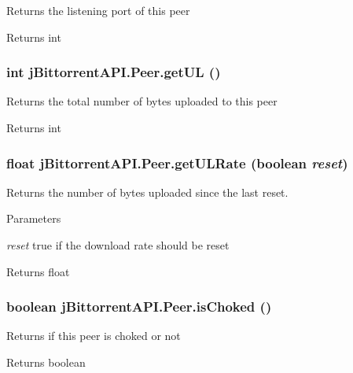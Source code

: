 \label{classj_bittorrent_a_p_i_1_1_peer_a8d9e796f58c6c0083ff7336986af72f6}
Returns the listening port of this peer \begin{DoxyReturn}{Returns}
int 
\end{DoxyReturn}
\hypertarget{classj_bittorrent_a_p_i_1_1_peer_a7e728ed4c9f505509669eec249ff4728}{
\subsubsection[{getUL}]{\setlength{\rightskip}{0pt plus 5cm}int jBittorrentAPI.Peer.getUL ()}}
\label{classj_bittorrent_a_p_i_1_1_peer_a7e728ed4c9f505509669eec249ff4728}
Returns the total number of bytes uploaded to this peer \begin{DoxyReturn}{Returns}
int 
\end{DoxyReturn}
\hypertarget{classj_bittorrent_a_p_i_1_1_peer_a3a73a98b5bed923f31a60ea06bec9d58}{
\subsubsection[{getULRate}]{\setlength{\rightskip}{0pt plus 5cm}float jBittorrentAPI.Peer.getULRate (boolean {\em reset})}}
\label{classj_bittorrent_a_p_i_1_1_peer_a3a73a98b5bed923f31a60ea06bec9d58}
Returns the number of bytes uploaded since the last reset. 
\begin{DoxyParams}{Parameters}
\item[{\em reset}]true if the download rate should be reset \end{DoxyParams}
\begin{DoxyReturn}{Returns}
float 
\end{DoxyReturn}
\hypertarget{classj_bittorrent_a_p_i_1_1_peer_aed29d428f718b3547a91a1fc5008d1df}{
\subsubsection[{isChoked}]{\setlength{\rightskip}{0pt plus 5cm}boolean jBittorrentAPI.Peer.isChoked ()}}
\label{classj_bittorrent_a_p_i_1_1_peer_aed29d428f718b3547a91a1fc5008d1df}
Returns if this peer is choked or not \begin{DoxyReturn}{Returns}
boolean 
\end{DoxyReturn}
